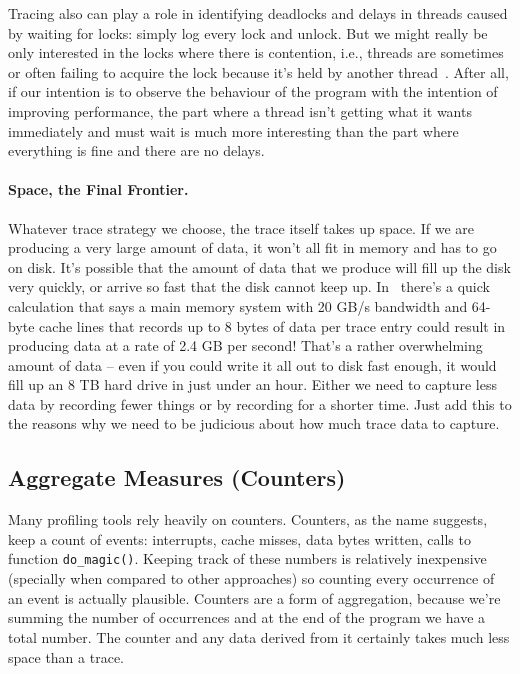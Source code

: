 \documentclass[a4paper]{report}
\begin{document}
Tracing also can play a role in identifying deadlocks and delays in threads caused by waiting for locks: simply log every lock and unlock. But we might really be only interested in the locks where there is contention, i.e., threads are sometimes or often failing to acquire the lock because it's held by another thread~\cite{usd}. After all, if our intention is to observe the behaviour of the program with the intention of improving performance, the part where a thread isn't getting what it wants immediately and must wait is much more interesting than the part where everything is fine and there are no delays.

\paragraph{Space, the Final Frontier.} Whatever trace strategy we choose, the trace itself takes up space. If we are producing a very large amount of data, it won't all fit in memory and has to go on disk. It's possible that the amount of data that we produce will fill up the disk very quickly, or arrive so fast that the disk cannot keep up. In~\cite{usd} there's a quick calculation that says a main memory system with 20 GB/s bandwidth and 64-byte cache lines that records up to 8 bytes of data per trace entry could result in producing data at a rate of 2.4 GB per second! That's a rather overwhelming amount of data -- even if you could write it all out to disk fast enough, it would fill up an 8 TB hard drive in just under an hour. Either we need to capture less data by recording fewer things or by recording for a shorter time. Just add this to the reasons why we need to be judicious about how much trace data to capture.

\subsection*{Aggregate Measures (Counters)}
Many profiling tools rely heavily on counters. Counters, as the name suggests, keep a count of events: interrupts, cache misses, data bytes written, calls to function \texttt{do\_magic()}. Keeping track of these numbers is relatively inexpensive (specially when compared to other approaches) so counting every occurrence of an event is actually plausible. Counters are a form of aggregation, because we're summing the number of occurrences and at the end of the program we have a total number. The counter and any data derived from it certainly takes much less space than a trace.
\end{document}
